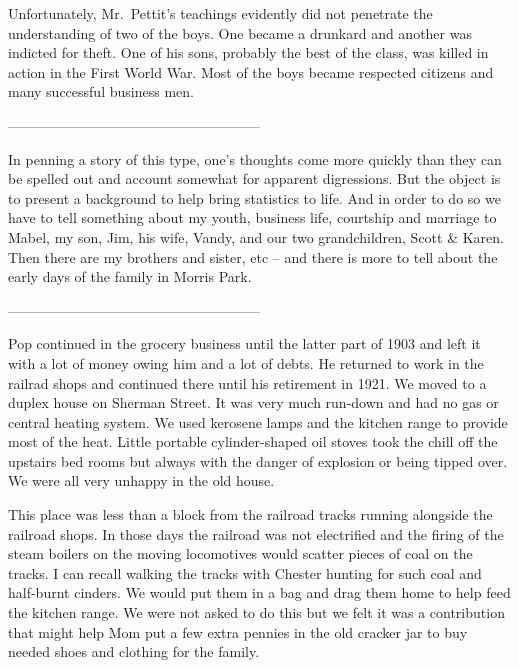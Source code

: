 \documentclass[12pt]{book}              %
\begin{document}
Unfortunately, Mr.~Pettit's teachings evidently did not penetrate the understanding of two of the boys. One became a drunkard and another was indicted for theft. One of his sons, probably the best of the class, was killed in action in the First World War. Most of the boys became respected citizens and many successful business men. 

\begin{center}
------------------------------------------------------
\end{center}
In penning a story of this type, one's thoughts come more quickly than they can be spelled out and account somewhat for apparent digressions. But the object is to present a background to help bring statistics to life. And in order to do so we have to tell something about my youth, business life, courtship and marriage to Mabel, my son, Jim, his wife, Vandy, and our two grandchildren, Scott \& Karen. Then there are my brothers and sister, etc -- and there is more to tell about the early days of the family in Morris Park. 
\begin{center}
------------------------------------------------------
\end{center}


Pop continued in the grocery business until the latter part of 1903 and left it with a lot of money owing him and a lot of debts. He returned to work in the railrad shops and continued there until his retirement in 1921. We moved to a duplex house on Sherman Street. It was very much run-down and had no gas or central heating system. We used kerosene lamps and the kitchen range to provide most of the heat. Little portable cylinder-shaped oil stoves took the chill off the upstairs bed rooms but always with the danger of explosion or being tipped over. We were all very unhappy in the old house.

This place was less than a block from the railroad tracks running alongside the railroad shops. In those days the railroad was not electrified and the firing of the steam boilers on the moving locomotives would scatter pieces of coal on the tracks. I can recall walking the tracks with Chester hunting for such coal and half-burnt cinders. We would put them in a bag and drag them home to help feed the kitchen range. We were not asked to do this but we felt it was a contribution that might help Mom put a few extra pennies in the old cracker jar to buy needed shoes and clothing for the family. 
\end{document}
